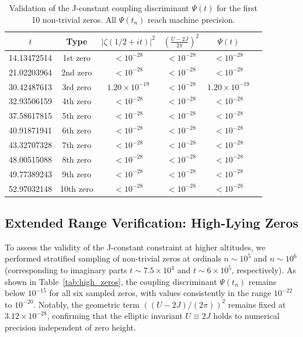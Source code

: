 \documentclass[11pt,a4paper]{article}
\theoremstyle{definition}
\begin{document}
\begin{table}[h!]
\centering
\caption{Validation of the J-constant coupling discriminant \(\Psi(t)\) for the first 10 non-trivial zeros. All \(\Psi(t_n)\) reach machine precision.}
\label{tab:psi_validation_low}
\begin{tabular}{cccccc}
\toprule
$t$ & Type & $|\zeta(1/2+it)|^2$ & $\left(\frac{U-2J}{2\pi}\right)^2$ & $\Psi(t)$ \\
\midrule
14.13472514 & 1st zero & $<10^{-28}$ & $<10^{-28}$ & $<10^{-28}$ \\
21.02203964 & 2nd zero & $<10^{-28}$ & $<10^{-28}$ & $<10^{-28}$ \\
30.42487613 & 3rd zero & $1.20\times10^{-19}$ & $<10^{-28}$ & $1.20\times10^{-19}$ \\
32.93506159 & 4th zero & $<10^{-28}$ & $<10^{-28}$ & $<10^{-28}$ \\
37.58617815 & 5th zero & $<10^{-28}$ & $<10^{-28}$ & $<10^{-28}$ \\
40.91871941 & 6th zero & $<10^{-28}$ & $<10^{-28}$ & $<10^{-28}$ \\
43.32707328 & 7th zero & $<10^{-28}$ & $<10^{-28}$ & $<10^{-28}$ \\
48.00515088 & 8th zero & $<10^{-28}$ & $<10^{-28}$ & $<10^{-28}$ \\
49.77389243 & 9th zero & $<10^{-28}$ & $<10^{-28}$ & $<10^{-28}$ \\
52.97032148 & 10th zero & $<10^{-28}$ & $<10^{-28}$ & $<10^{-28}$ \\
\bottomrule
\end{tabular}
\end{table}

\subsection{Extended Range Verification: High-Lying Zeros}

To assess the validity of the J-constant constraint at higher altitudes, we performed stratified sampling of non-trivial zeros at ordinals \(n \sim 10^5\) and \(n \sim 10^6\) (corresponding to imaginary parts \(t \sim 7.5 \times 10^4\) and \(t \sim 6 \times 10^5\), respectively). 
As shown in Table~\ref{tab:high_zeros}, the coupling discriminant \(\Psi(t_n)\) remains below \(10^{-15}\) for all six sampled zeros, with values consistently in the range \(10^{-22}\) to \(10^{-20}\). 
Notably, the geometric term \(\left((U-2J)/(2\pi)\right)^2\) remains fixed at \(3.12 \times 10^{-28}\), confirming that the elliptic invariant \(U \equiv 2J\) holds to numerical precision independent of zero height.
\end{document}

